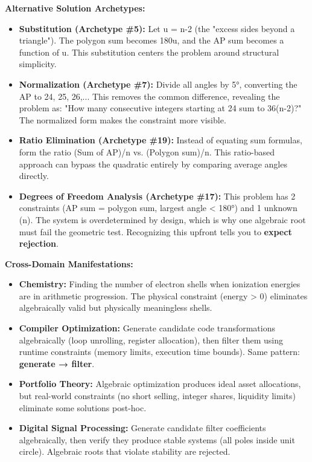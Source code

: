 \documentclass{article}
\begin{document}
\noindent \textbf{Alternative Solution Archetypes:}
\begin{itemize}
    \item \textbf{Substitution (Archetype \#5):} Let u = n-2 (the "excess sides beyond a triangle"). The polygon sum becomes 180u, and the AP sum becomes a function of u. This substitution centers the problem around structural simplicity.
    \item \textbf{Normalization (Archetype \#7):} Divide all angles by 5°, converting the AP to 24, 25, 26,... This removes the common difference, revealing the problem as: "How many consecutive integers starting at 24 sum to 36(n-2)?" The normalized form makes the constraint more visible.
    \item \textbf{Ratio Elimination (Archetype \#19):} Instead of equating sum formulas, form the ratio (Sum of AP)/n vs. (Polygon sum)/n. This ratio-based approach can bypass the quadratic entirely by comparing average angles directly.
    \item \textbf{Degrees of Freedom Analysis (Archetype \#17):} This problem has 2 constraints (AP sum = polygon sum, largest angle < 180°) and 1 unknown (n). The system is overdetermined by design, which is why one algebraic root must fail the geometric test. Recognizing this upfront tells you to \textbf{expect rejection}.
\end{itemize}

\noindent \textbf{Cross-Domain Manifestations:}
\begin{itemize}
    \item \textbf{Chemistry:} Finding the number of electron shells when ionization energies are in arithmetic progression. The physical constraint (energy > 0) eliminates algebraically valid but physically meaningless shells.
    \item \textbf{Compiler Optimization:} Generate candidate code transformations algebraically (loop unrolling, register allocation), then filter them using runtime constraints (memory limits, execution time bounds). Same pattern: \textbf{generate → filter}.
    \item \textbf{Portfolio Theory:} Algebraic optimization produces ideal asset allocations, but real-world constraints (no short selling, integer shares, liquidity limits) eliminate some solutions post-hoc.
    \item \textbf{Digital Signal Processing:} Generate candidate filter coefficients algebraically, then verify they produce stable systems (all poles inside unit circle). Algebraic roots that violate stability are rejected.
\end{itemize}
\end{document}
